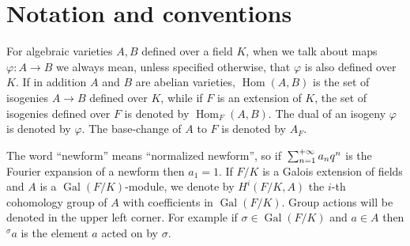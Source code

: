 \documentclass[11pt]{amsart}
\theoremstyle{definition}
\begin{document}
	\section*{Notation and conventions}
	For algebraic varieties $A,B$ defined over a field $K$, when we talk about maps $\varphi\colon A\to B$ we always mean, unless specified otherwise, that $\varphi$ is also defined over $K$. If in addition $A$ and $B$ are abelian varieties, $\operatorname{Hom}(A,B)$ is the set of isogenies $A\to B$ defined over $K$, while if $F$ is an extension of $K$, the set of isogenies defined over $F$ is denoted by $\operatorname{Hom}_F(A,B)$. The dual of an isogeny $\varphi$ is denoted by $\widehat{\varphi}$. The base-change of $A$ to $F$ is denoted by $A_F$.

	The word ``newform'' means ``normalized newform'', so if ${\displaystyle} \sum_{n=1}^{+\infty} a_nq^n$ is the Fourier expansion of a newform then $a_1=1$.
	If $F/K$ is a Galois extension of fields and $A$ is a $\operatorname{Gal}(F/K)$-module, we denote by $H^i(F/K,A)$ the $i$-th cohomology group of $A$ with coefficients in $\operatorname{Gal}(F/K)$. Group actions will be denoted in the upper left corner. For example if $\sigma \in \operatorname{Gal}(F/K)$ and $a\in A$ then ${{}^\sigma\!} a$ is the element $a$ acted on by $\sigma$.
\end{document}
